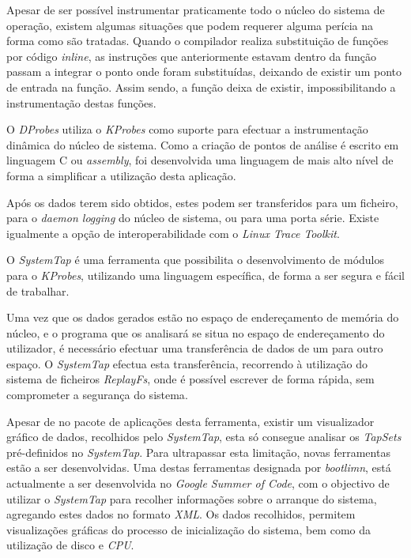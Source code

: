 Apesar de ser possível instrumentar praticamente todo o núcleo do sistema de operação, existem algumas situações que podem requerer alguma perícia na forma como são tratadas.
Quando o compilador realiza substituição de funções por código \textit{inline}, as instruções que anteriormente estavam dentro da função passam a integrar o ponto onde foram substituídas, deixando de existir um ponto de entrada na função.
Assim sendo, a função deixa de existir, impossibilitando a instrumentação destas funções.


O \textit{DProbes} utiliza o \textit{KProbes} como suporte para efectuar a instrumentação dinâmica do núcleo de sistema.
Como a criação de pontos de análise é escrito em linguagem C ou \textit{assembly}, foi desenvolvida uma linguagem de mais alto nível de forma a simplificar a utilização desta aplicação.

Após os dados terem sido obtidos, estes podem ser transferidos para um ficheiro, para o \textit{daemon logging} do núcleo de sistema, ou para uma porta série.
Existe igualmente a opção de interoperabilidade com o \textit{Linux Trace Toolkit}\cite{:DProbes}.


O \textit{SystemTap} é uma ferramenta que possibilita o desenvolvimento de módulos para o \textit{KProbes}, utilizando uma linguagem específica, de forma a ser segura e fácil de trabalhar.

Uma vez que os dados gerados estão no espaço de endereçamento de memória do núcleo, e o programa que os analisará se situa no espaço de endereçamento do utilizador, é necessário efectuar uma transferência de dados de um para outro espaço.
O \textit{SystemTap} efectua esta transferência, recorrendo à utilização do sistema de ficheiros \textit{ReplayFs}, onde é possível escrever de forma rápida, sem comprometer a segurança do sistema\cite{Donovan2007,Jones2009}.

Apesar de no pacote de aplicações desta ferramenta, existir um visualizador gráfico de dados, recolhidos pelo \textit{SystemTap}, esta só consegue analisar os \textit{TapSets} pré-definidos no \textit{SystemTap}.
Para ultrapassar esta limitação, novas ferramentas estão a ser desenvolvidas.
Uma destas ferramentas designada por \textit{bootlimn}, está actualmente a ser desenvolvida no \textit{Google Summer of Code}, com o objectivo de utilizar o \textit{SystemTap} para recolher informações sobre o arranque do sistema, agregando estes dados no formato \textit{XML}.
Os dados recolhidos, permitem visualizações gráficas do processo de inicialização do sistema, bem como da utilização de disco e \textit{CPU}.

